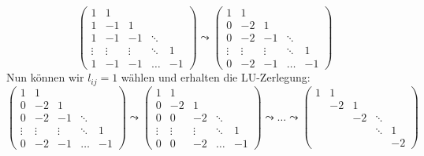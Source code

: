 \documentclass{article}
\theoremstyle{definition}
\begin{document}
\begin{enumerate}[(a)]
\[\begin{pmatrix}
                  1      & 1      &        &        &    \\
                  1      & -1     & 1      &        &    \\
                  1      & -1     & -1     & \ddots &    \\
                  \vdots & \vdots & \vdots & \ddots & 1  \\
                  1      & -1     & -1     & \dots  & -1
              \end{pmatrix}
              \leadsto
              \begin{pmatrix}
                  1      & 1      &        &        &    \\
                  0      & -2     & 1      &        &    \\
                  0      & -2     & -1     & \ddots &    \\
                  \vdots & \vdots & \vdots & \ddots & 1  \\
                  0      & -2     & -1     & \dots  & -1
              \end{pmatrix}
          \]
          Nun können wir $l_{ij} = 1$ wählen und erhalten die LU-Zerlegung:
          \[
              \begin{pmatrix}
                  1      & 1      &        &        &    \\
                  0      & -2     & 1      &        &    \\
                  0      & -2     & -1     & \ddots &    \\
                  \vdots & \vdots & \vdots & \ddots & 1  \\
                  0      & -2     & -1     & \dots  & -1
              \end{pmatrix}
              \leadsto
              \begin{pmatrix}
                  1      & 1      &        &        &    \\
                  0      & -2     & 1      &        &    \\
                  0      & 0      & -2     & \ddots &    \\
                  \vdots & \vdots & \vdots & \ddots & 1  \\
                  0      & 0      & -2     & \dots  & -1
              \end{pmatrix}
              \leadsto \dots \leadsto
              \begin{pmatrix}
                  1 & 1  &    &        &    \\
                    & -2 & 1  &        &    \\
                    &    & -2 & \ddots &    \\
                    &    &    & \ddots & 1  \\
                    &    &    &        & -2
              \end{pmatrix}
          \]
\end{enumerate}
\end{document}
